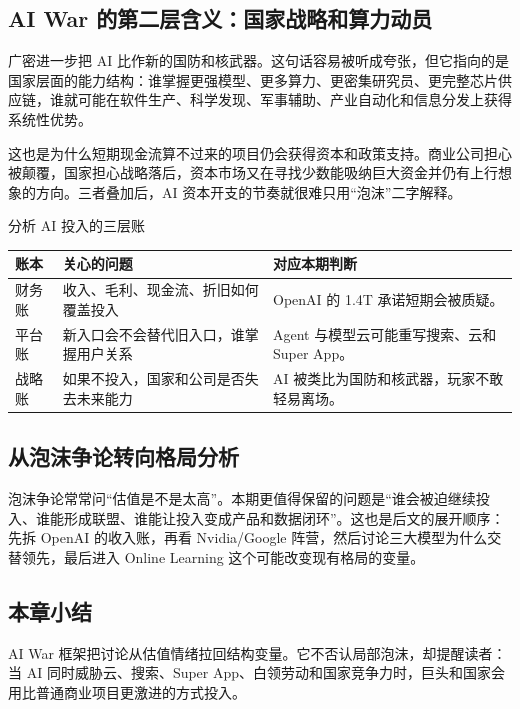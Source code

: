 \subsection{AI War 的第二层含义：国家战略和算力动员}

广密进一步把 AI 比作新的国防和核武器。这句话容易被听成夸张，但它指向的是国家层面的能力结构：谁掌握更强模型、更多算力、更密集研究员、更完整芯片供应链，谁就可能在软件生产、科学发现、军事辅助、产业自动化和信息分发上获得系统性优势。

这也是为什么短期现金流算不过来的项目仍会获得资本和政策支持。商业公司担心被颠覆，国家担心战略落后，资本市场又在寻找少数能吸纳巨大资金并仍有上行想象的方向。三者叠加后，AI 资本开支的节奏就很难只用“泡沫”二字解释。

\begin{importantbox}{分析 AI 投入的三层账}
\begin{tabularx}{\textwidth}{p{}p{}X}
\toprule
账本 & 关心的问题 & 对应本期判断 \\
\midrule
财务账 & 收入、毛利、现金流、折旧如何覆盖投入 & OpenAI 的 1.4T 承诺短期会被质疑。 \\
平台账 & 新入口会不会替代旧入口，谁掌握用户关系 & Agent 与模型云可能重写搜索、云和 Super App。 \\
战略账 & 如果不投入，国家和公司是否失去未来能力 & AI 被类比为国防和核武器，玩家不敢轻易离场。 \\
\bottomrule
\end{tabularx}
\end{importantbox}

\subsection{从泡沫争论转向格局分析}

泡沫争论常常问“估值是不是太高”。本期更值得保留的问题是“谁会被迫继续投入、谁能形成联盟、谁能让投入变成产品和数据闭环”。这也是后文的展开顺序：先拆 OpenAI 的收入账，再看 Nvidia/Google 阵营，然后讨论三大模型为什么交替领先，最后进入 Online Learning 这个可能改变现有格局的变量。

\subsection{本章小结}

AI War 框架把讨论从估值情绪拉回结构变量。它不否认局部泡沫，却提醒读者：当 AI 同时威胁云、搜索、Super App、白领劳动和国家竞争力时，巨头和国家会用比普通商业项目更激进的方式投入。

